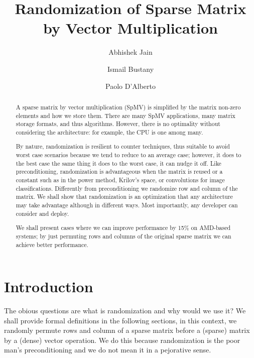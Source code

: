 \documentclass[manuscript,screen]{acmart}
\begin{document}
\title{Randomization of Sparse Matrix by Vector Multiplication }

\author{Abhishek Jain}
\author{Ismail Bustany}
\author{Paolo D'Alberto}


\renewcommand{\shortauthors}{Jain et al.}

\begin{abstract}
A sparse matrix by vector multiplication (SpMV) is simplified by the
matrix non-zero elements and how we store them. There are many SpMV
applications, many matrix storage formats, and thus
algorithms. However, there is no optimality without considering the
architecture: for example, the CPU is one among many.

By nature, randomization is resilient to counter techniques, thus
suitable to avoid worst case scenarios because we tend to reduce to an
average case; however, it does to the best case the same thing it does
to the worst case, it can nudge it off. Like preconditioning,
randomization is advantageous when the matrix is reused or a constant
such as in the power method, Krilov's space, or convolutions for image
classifications. Differently from preconditioning we randomize row and
column of the matrix. We shall show that randomization is an
optimization that any architecture may take advantage although in
different ways. Most importantly, any developer can consider and
deploy.

We shall present cases where we can improve performance by 15\% on
AMD-based systems; by just permuting rows and columns of the original
sparse matrix we can achieve better performance.

\end{abstract}

\maketitle

\section{Introduction} 
\label{sec:introduction}

The obious questions are what is randomization and why would we use
it? We shall provide formal definitions in the following sections, in
this context, we randomly permute rows and column of a sparse matrix
before a (sparse) matrix by a (dense) vector operation. We do this
because randomization is the poor man's preconditioning and we do not
mean it in a pejorative sense.
\end{document}
